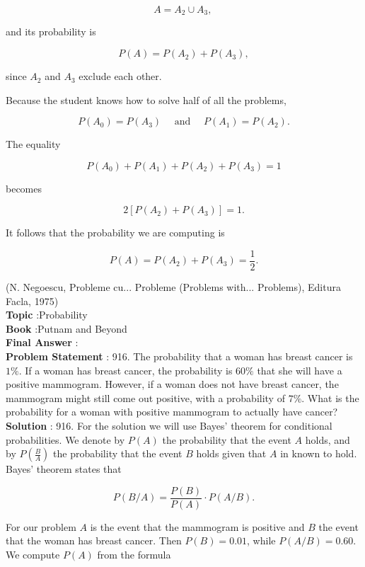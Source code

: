 \documentclass[10pt]{article}
\begin{document}
$$
A=A_{2} \cup A_{3} \text {, }
$$

and its probability is

$$
P(A)=P\left(A_{2}\right)+P\left(A_{3}\right),
$$

since $A_{2}$ and $A_{3}$ exclude each other.

Because the student knows how to solve half of all the problems,

$$
P\left(A_{0}\right)=P\left(A_{3}\right) \quad \text { and } \quad P\left(A_{1}\right)=P\left(A_{2}\right) .
$$

The equality

$$
P\left(A_{0}\right)+P\left(A_{1}\right)+P\left(A_{2}\right)+P\left(A_{3}\right)=1
$$

becomes

$$
2\left[P\left(A_{2}\right)+P\left(A_{3}\right)\right]=1 .
$$

It follows that the probability we are computing is

$$
P(A)=P\left(A_{2}\right)+P\left(A_{3}\right)=\frac{1}{2} .
$$

(N. Negoescu, Probleme cu... Probleme (Problems with... Problems), Editura Facla, 1975)
\\
\textbf{Topic} :Probability\\
\textbf{Book} :Putnam and Beyond\\
\textbf{Final Answer} :\\


\textbf{Problem Statement} :
916. The probability that a woman has breast cancer is $1 \%$. If a woman has breast cancer, the probability is $60 \%$ that she will have a positive mammogram. However, if a woman does not have breast cancer, the mammogram might still come out positive, with a probability of $7 \%$. What is the probability for a woman with positive mammogram to actually have cancer?
\\
\textbf{Solution} :
916. For the solution we will use Bayes' theorem for conditional probabilities. We denote by $P(A)$ the probability that the event $A$ holds, and by $P\left(\frac{B}{A}\right)$ the probability that the event $B$ holds given that $A$ in known to hold. Bayes' theorem states that 

$$
P(B / A)=\frac{P(B)}{P(A)} \cdot P(A / B) .
$$

For our problem $A$ is the event that the mammogram is positive and $B$ the event that the woman has breast cancer. Then $P(B)=0.01$, while $P(A / B)=0.60$. We compute $P(A)$ from the formula
\end{document}
